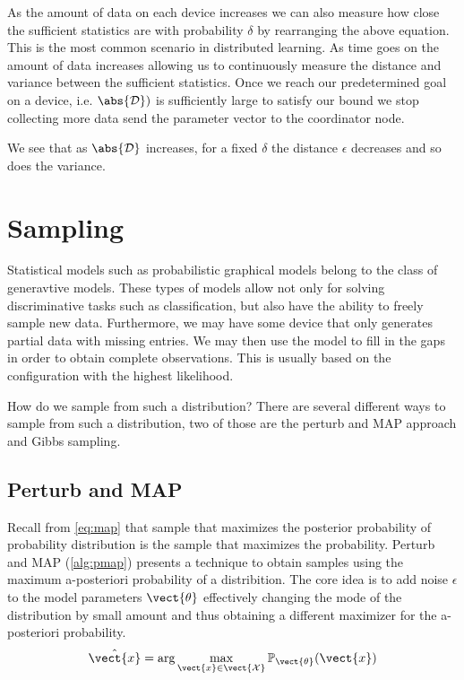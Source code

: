 As the amount of data on each device increases we can also measure how close the sufficient statistics are with probability $\delta$ by rearranging the above equation. 
This is the most common scenario in distributed learning. As time goes on the amount of data increases allowing us to continuously measure the distance and variance between the sufficient statistics.
Once we reach our predetermined goal on a device, i.e. $\abs{\mathcal{D}}^^i$ is sufficiently large to satisfy our bound we stop collecting more data send the parameter vector to the coordinator node.


We see that as $\abs{\mathcal{D}}$ increases, for a fixed $\delta$ the distance $\epsilon$ decreases and so does the variance. 

\section{Sampling}
Statistical models such as probabilistic graphical models belong to the class of generavtive models.
These types of models allow not only for solving discriminative tasks such as classification, but also have the ability to freely sample new data.
Furthermore, we may have some device that only generates partial data with missing entries.
We may then use the model to fill in the gaps in order to obtain complete observations.
This is usually based on the configuration with the highest likelihood.

How do we sample from such a distribution? There are several different ways to sample from such a distribution, two of those are the perturb and MAP approach and Gibbs sampling.


\subsection{Perturb and MAP}
\label{ssec:pmap}
Recall from \eq\ref{eq:map} that sample that maximizes the posterior probability of probability distribution is the sample that maximizes the probability.
Perturb and MAP (\alg\ref{alg:pmap}) presents a technique to obtain samples using the maximum a-posteriori probability of a distribition.
The core idea is to add noise $\epsilon$ to the model parameters $\vect{\theta}$ effectively changing the mode of the distribution by small amount and thus obtaining a different maximizer for the a-posteriori probability. 
\begin{equation}
    \hat{\vect{x}}  = \arg\max_{\vect{x} \in \vect{\mathcal{X}}} \mathbb{P}_{\vect{\theta}}(\vect{x})
\end{equation}

